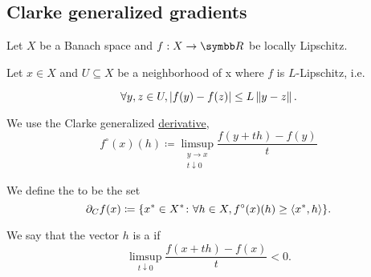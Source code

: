 \subsection{Clarke generalized gradients}\label{subsec:clarke_gradients}

Let \( X \) be a Banach space and \( f: X \to \BR \) be locally Lipschitz.

\begin{definition}\label{def:clarke_gradient}
  Let \( x \in X \) and \( U \subseteq X \) be a neighborhood of x where \( f \) is \( L \)-Lipschitz, i.e.

  \begin{equation*}
    \forall y, z \in U, \left\vert f(y) - f(z) \right\vert \leq L \left\Vert y - z \right\Vert.
  \end{equation*}

  We use the Clarke generalized \hyperref[def:nonsmooth_derivatives/clarke]{derivative},
  \begin{equation*}
    f^\circ(x)(h) \coloneqq \limsup_{\substack{y \to x \\ t \downarrow 0}} \frac {f(y + th) - f(y)} t
  \end{equation*}

  We define the  to be the set
  \begin{equation*}
    \partial_C f(x) \coloneqq \{ x^* \in X^* \colon \forall h \in X, f^\circ(x)(h) \geq \left\langle x^*, h \right\rangle \}.
  \end{equation*}

  We say that the vector \( h \) is a  if
  \begin{equation*}
    \limsup_{t \downarrow 0} \frac {f(x + th) - f(x)} t < 0.
  \end{equation*}
\end{definition}

